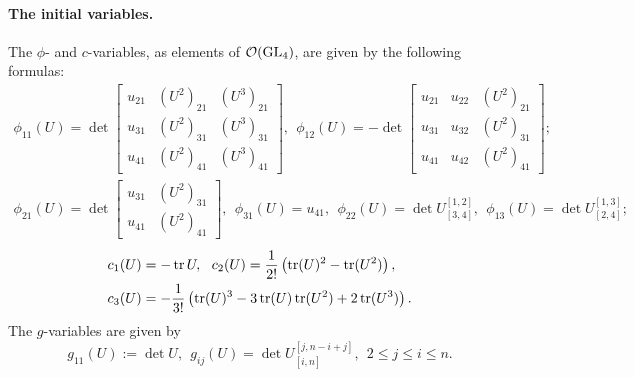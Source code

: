 \paragraph{The initial variables.} The $\phi$- and $c$-variables, as elements of $\mathcal{O}(\operatorname{GL}_4)$, are given by the following formulas:
\begin{align}
    \phi_{11}(U) = \det \begin{bmatrix} u_{21} & (U^2)_{21} & (U^3)_{21} \\ u_{31} & (U^2)_{31} & (U^3)_{31}\\ u_{41} & (U^2)_{41} & (U^3)_{41} \end{bmatrix}, \ \ \phi_{12}(U) = -\det\begin{bmatrix}u_{21} & u_{22} & (U^2)_{21}\\ u_{31} & u_{32} & (U^2)_{31}\\ u_{41} & u_{42} & (U^2)_{41} \end{bmatrix};\\
    \phi_{21}(U) = \det \begin{bmatrix}
        u_{31} & (U^2)_{31} \\ u_{41} & (U^2)_{41}
    \end{bmatrix}, \ \ \phi_{31}(U) = u_{41}, \ \ \phi_{22}(U) = \det U^{[1,2]}_{[3,4]}, \ \ \phi_{13}(U) = \det U^{[1,3]}_{[2,4]};
\end{align}
\begin{align}
    &c_1(U) = -\operatorname{tr} U, \ \ c_2(U) = \frac{1}{2!}\left(\operatorname{tr}(U)^2 - \operatorname{tr}(U^2)\right),\\ &c_3(U) = -\frac{1}{3!}\left( \operatorname{tr}(U)^3 - 3\operatorname{tr}(U)\operatorname{tr}(U^2)+2\operatorname{tr}(U^3)\right).
\end{align}
The $g$-variables are given by
\begin{equation}
    g_{11}(U):=\det U, \ \ g_{ij}(U) = \det U^{[j,n-i+j]}_{[i,n]}, \ \ 2 \leq j \leq i \leq n.
\end{equation}
